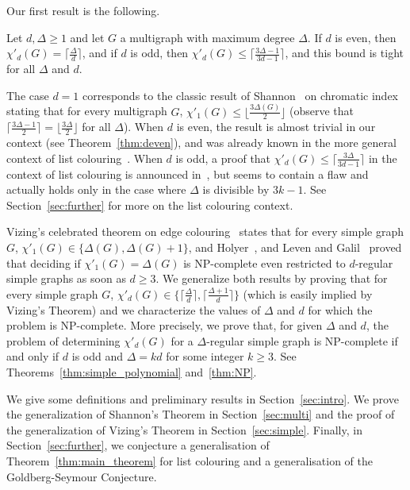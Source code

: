 Our first result is the following.

\begin{theorem}\label{thm:main_theorem}
Let $d, \Delta \geq 1$ and let $G$ a multigraph with maximum degree $\Delta$. 
If $d$ is even, then $\chi'_{d}(G) = \lceil \frac{\Delta}{d} \rceil$, and if $d$ is odd, then $\chi'_{d}(G) \leq \lceil \frac{3\Delta - 1}{3d - 1} \rceil$, and this bound is tight for all $\Delta$ and $d$. 
\end{theorem}

The case $d=1$ corresponds to the classic result of Shannon~\cite{S49} on chromatic index  stating that for every multigraph $G$, $\chi'_1(G) \leq \lfloor \frac{3\Delta(G)}{2} \rfloor$ (observe that $\lceil \frac{3\Delta - 1}{2} \rceil = \lfloor \frac{3\Delta}{2} \rfloor$ for all $\Delta$). 
When $d$ is even, the result is almost trivial in our context (see Theorem~\ref{thm:deven}), and was already known in the more general context of list colouring~\cite{HILTON2001253, amini:inria-00144318}. 
When $d$ is odd, a proof that $\chi'_d(G) \leq \lceil \frac{3\Delta}{3d - 1} \rceil$ in the context of list colouring is announced in~\cite{amini:inria-00144318}, but seems to contain a flaw and actually holds only in the case where $\Delta$ is divisible by $3k-1$. See Section~\ref{sec:further} for more on the list colouring context. 

\medskip


Vizing's celebrated theorem on edge colouring~\cite{V64} states that for every simple graph $G$, $\chi'_1(G) \in \{\Delta(G), \Delta(G) +1\}$, and Holyer~\cite{H81}, and Leven and Galil~\cite{LZ83} proved that deciding if $\chi'_1(G) =\Delta(G)$ is NP-complete even restricted to $d$-regular simple graphs as soon as $d \geq 3$. 
We generalize both results by proving that for every simple graph $G$, $\chi'_{d}(G) \in \{ \lceil \frac{\Delta}{d} \rceil, \lceil \frac{\Delta+1}{d} \rceil \}$ (which is easily implied by Vizing's Theorem) and we characterize the values of $\Delta$ and $d$ for which the problem is NP-complete. 
More precisely, we prove that, for given $\Delta$ and $d$, the problem of determining $\chi'_d(G)$ for a $\Delta$-regular simple graph is NP-complete if and only if $d$ is odd and $\Delta = kd$ for some integer $k \geq 3$. See Theorems~\ref{thm:simple_polynomial} and~\ref{thm:NP}. 
\medskip

We give some definitions and preliminary results in Section~\ref{sec:intro}.
We prove the generalization of Shannon's Theorem in Section~\ref{sec:multi} and the proof of the generalization of Vizing's Theorem in Section~\ref{sec:simple}. Finally, in Section~\ref{sec:further}, we conjecture a generalisation of Theorem~\ref{thm:main_theorem} for list colouring and a generalisation of the Goldberg-Seymour Conjecture.
\medskip

